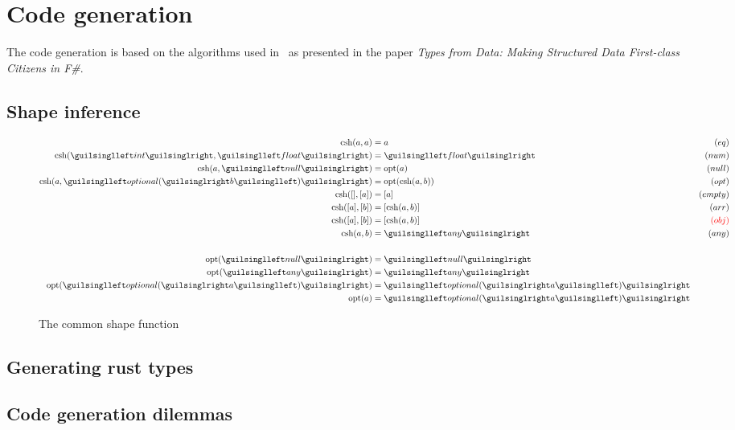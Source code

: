 
\chapter{Code generation}

The code generation is based on the algorithms used in \fsharpdata\ as presented in the paper \emph{Types from Data: Making Structured Data First-class Citizens in F\#}\cite{fsharp-types-from-data}.

\section{Shape inference}

\begin{figure}[ht!]
\begin{align*}
\csh(a, a)               &=  a               & (eq) \\
\csh(‹int›, ‹float›)     &= ‹float›          & (num) \\
\csh(a, ‹null›)          &= \opt(a)          & (null) \\
\csh(a, ‹optional(›b‹)›) &= \opt(\csh(a, b)) & (opt) \\
\csh([], [a])            &= [a]              & (empty) \\
\csh([a], [b])           &= [\csh(a, b)]     & (arr) \\
\csh([a], [b])           &= [\csh(a, b)]     & \color{red} (obj) \\
\csh(a, b)               &= ‹any›            & (any) \\
\\
\opt(‹null›) &= ‹null› \\
\opt(‹any›)  &= ‹any› \\
\opt(‹optional(›a‹)›) &= ‹optional(›a‹)› \\
\opt(a) &= ‹optional(›a‹)›
\end{align*}
\caption{The common shape function}
\label{fig:csh}
\end{figure}

\section{Generating rust types}

\section{Code generation dilemmas}
\label{sec:design-considerations}

